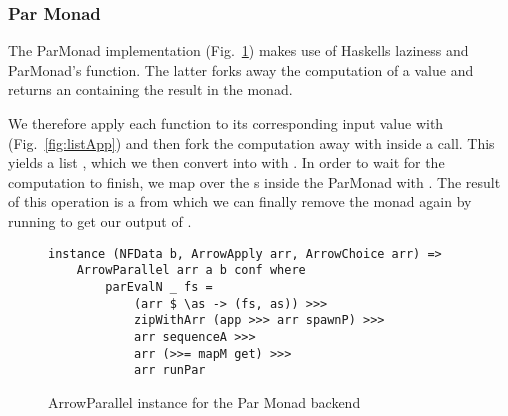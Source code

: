 \subsubsection{Par Monad}
The ParMonad implementation (Fig.~\ref{fig:ArrowParallelParMonad}) makes use of Haskells laziness and ParMonad's  function. The latter forks away the computation of a value and returns an  containing the result in the  monad.


We therefore apply each function to its corresponding input value with  (Fig.~\ref{fig:listApp}) and then fork the computation away with  inside a  call. This yields a list , which we then convert into  with . In order to wait for the computation to finish, we map over the s inside the ParMonad with . The result of this operation is a  from which we can finally remove the monad again by running  to get our output of \inlinecode{[b]}.
\begin{figure}[h]
\begin{lstlisting}[frame=htrbl]
instance (NFData b, ArrowApply arr, ArrowChoice arr) =>
	ArrowParallel arr a b conf where
		parEvalN _ fs = 
			(arr $ \as -> (fs, as)) >>>
			zipWithArr (app >>> arr spawnP) >>>
			arr sequenceA >>>
			arr (>>= mapM get) >>>
			arr runPar
\end{lstlisting} %
\caption{ArrowParallel instance for the Par Monad backend}
\label{fig:ArrowParallelParMonad}
\end{figure}

